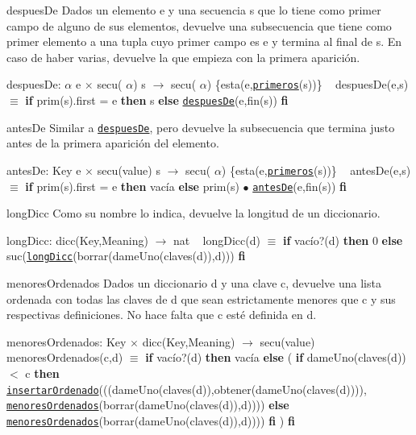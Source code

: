 \begin{DoxyParagraph}{despues\+De}
Dados un elemento e y una secuencia s que lo tiene como primer campo de alguno de sus elementos, devuelve una subsecuencia que tiene como primer elemento a una tupla cuyo primer campo es e y termina al final de s. En caso de haber varias, devuelve la que empieza con la primera aparición.

despues\+De\+:  $\alpha$ e $\times$ secu( $\alpha$) s $\to$ secu( $\alpha$) \{esta(e,\href{axiomas.html#primeros}{\tt primeros}(s))\} ~\newline
despues\+De(e,s) $\equiv$ {\bfseries if} prim(s).first = e {\bfseries then} s {\bfseries else} \href{axiomas.html#despuesDe}{\tt despues\+De}(e,fin(s)) {\bfseries fi} 


\end{DoxyParagraph}
\begin{DoxyParagraph}{antes\+De}
Similar a \href{axiomas.html#despuesDe}{\tt despues\+De}, pero devuelve la subsecuencia que termina justo antes de la primera aparición del elemento.

antes\+De\+: Key e $\times$ secu(value) s $\to$ secu( $\alpha$) \{esta(e,\href{axiomas.html#primeros}{\tt primeros}(s))\} ~\newline
antes\+De(e,s) $\equiv$ {\bfseries if} prim(s).first = e {\bfseries then} vacía {\bfseries else} prim(s) $\bullet$ \href{axiomas.html#antesDe}{\tt antes\+De}(e,fin(s)) {\bfseries fi} 


\end{DoxyParagraph}
\begin{DoxyParagraph}{long\+Dicc}
Como su nombre lo indica, devuelve la longitud de un diccionario.

long\+Dicc\+: dicc(\+Key,\+Meaning) $\to$ nat ~\newline
long\+Dicc(d) $\equiv$ {\bfseries if} vacío?(d) {\bfseries then} 0 {\bfseries else} suc(\href{axiomas.html#longDicc}{\tt long\+Dicc}(borrar(dame\+Uno(claves(d)),d))) {\bfseries fi} 


\end{DoxyParagraph}
\begin{DoxyParagraph}{menores\+Ordenados}
Dados un diccionario d y una clave c, devuelve una lista ordenada con todas las claves de d que sean estrictamente menores que c y sus respectivas definiciones. No hace falta que c esté definida en d.

menores\+Ordenados\+: Key $\times$ dicc(\+Key,\+Meaning) $\to$ secu(value) ~\newline
menores\+Ordenados(c,d) $\equiv$ {\bfseries if} vacío?(d) {\bfseries then} vacía {\bfseries else} ( {\bfseries if} dame\+Uno(claves(d)) $<$ c {\bfseries then} \href{axiomas.html#insertarOrdenado}{\tt insertar\+Ordenado}(((dame\+Uno(claves(d)),obtener(dame\+Uno(claves(d)))), \href{axiomas.html#menoresOrdenados}{\tt menores\+Ordenados}(borrar(dame\+Uno(claves(d)),d)))) {\bfseries else} \href{axiomas.html#menoresOrdenados}{\tt menores\+Ordenados}(borrar(dame\+Uno(claves(d)),d)))) {\bfseries fi} ) {\bfseries fi} 


\end{DoxyParagraph}
